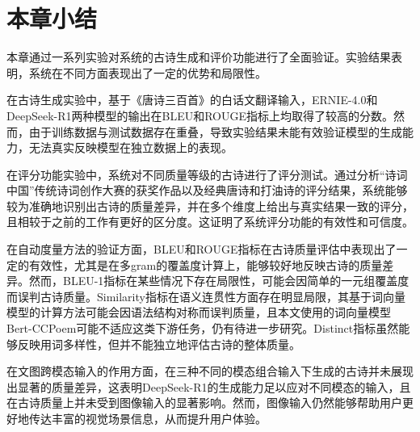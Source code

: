 \section{本章小结}

本章通过一系列实验对系统的古诗生成和评价功能进行了全面验证。实验结果表明，系统在不同方面表现出了一定的优势和局限性。

在古诗生成实验中，基于《唐诗三百首》的白话文翻译输入，ERNIE-4.0和DeepSeek-R1两种模型的输出在BLEU和ROUGE指标上均取得了较高的分数。然而，由于训练数据与测试数据存在重叠，导致实验结果未能有效验证模型的生成能力，无法真实反映模型在独立数据上的表现。

在评分功能实验中，系统对不同质量等级的古诗进行了评分测试。通过分析“诗词中国”传统诗词创作大赛的获奖作品以及经典唐诗和打油诗的评分结果，系统能够较为准确地识别出古诗的质量差异，并在多个维度上给出与真实结果一致的评分，且相较于之前的工作有更好的区分度。这证明了系统评分功能的有效性和可信度。

在自动度量方法的验证方面，BLEU和ROUGE指标在古诗质量评估中表现出了一定的有效性，尤其是在多gram的覆盖度计算上，能够较好地反映古诗的质量差异。然而，BLEU-1指标在某些情况下存在局限性，可能会因简单的一元组覆盖度而误判古诗质量。Similarity指标在语义连贯性方面存在明显局限，其基于词向量模型的计算方法可能会因语法结构对称而误判质量，且本文使用的词向量模型Bert-CCPoem可能不适应这类下游任务，仍有待进一步研究。Distinct指标虽然能够反映用词多样性，但并不能独立地评估古诗的整体质量。

在文图跨模态输入的作用方面，在三种不同的模态组合输入下生成的古诗并未展现出显著的质量差异，这表明DeepSeek-R1的生成能力足以应对不同模态的输入，且在古诗质量上并未受到图像输入的显著影响。然而，图像输入仍然能够帮助用户更好地传达丰富的视觉场景信息，从而提升用户体验。